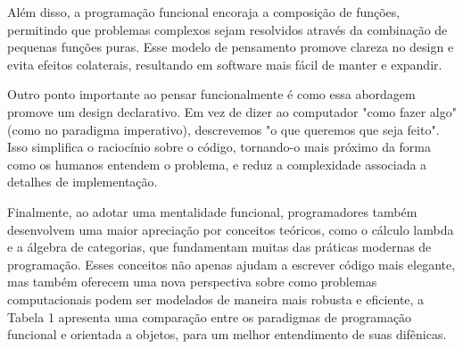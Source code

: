 Além disso, a programação funcional encoraja a composição de funções, permitindo que problemas complexos sejam resolvidos através da combinação de pequenas funções puras. Esse modelo de pensamento promove clareza no design e evita efeitos colaterais, resultando em software mais fácil de manter e expandir.

Outro ponto importante ao pensar funcionalmente é como essa abordagem promove um design declarativo. Em vez de dizer ao computador "como fazer algo" (como no paradigma imperativo), descrevemos "o que queremos que seja feito". Isso simplifica o raciocínio sobre o código, tornando-o mais próximo da forma como os humanos entendem o problema, e reduz a complexidade associada a detalhes de implementação.

Finalmente, ao adotar uma mentalidade funcional, programadores também desenvolvem uma maior apreciação por conceitos teóricos, como o cálculo lambda e a álgebra de categorias, que fundamentam muitas das práticas modernas de programação. Esses conceitos não apenas ajudam a escrever código mais elegante, mas também oferecem uma nova perspectiva sobre como problemas computacionais podem ser modelados de maneira mais robusta e eficiente, a Tabela 1 apresenta uma comparação entre os paradigmas de programação funcional e orientada a objetos, para um melhor entendimento de suas difênicas.

\begin{table}[H]
\centering
\caption{Programação Funcional Vs Programação Orientada a Objetos}
\label{tab:comparacao_funcional_oo}
\end{table}

